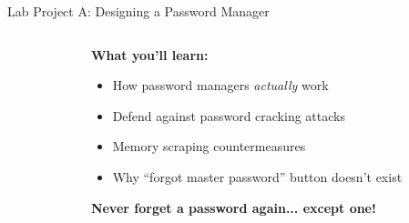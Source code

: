 \documentclass[aspectratio=169, lualatex, handout]{beamer}
\begin{document}
\begin{frame}{Lab Project A: Designing a Password Manager}
	\begin{columns}[c]
		\begin{column}{0.5\textwidth}
		\end{column}
		\begin{column}{0.5\textwidth}
			\textbf{What you'll learn:}
			\begin{itemize}[<+->]
				\item How password managers \textit{actually} work
				\item Defend against password cracking attacks
				\item Memory scraping countermeasures
				\item Why ``forgot master password'' button doesn't exist
			\end{itemize}
			\vspace{0.5cm}
			\textcolor{cipherprimary}{\textbf{Never forget a password again... except one!}}
		\end{column}
	\end{columns}
\end{frame}
\end{document}
